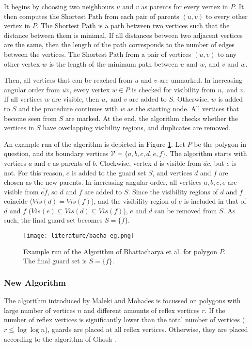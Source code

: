 It begins by choosing two neighbours $u$ and $v$ as parents for every vertex in $P$. It then computes the Shortest Path from each pair of parents $(u, v)$ to every other vertex in $P$. The Shortest Path is a path between two vertices such that the distance between them is minimal. If all distances between two adjacent vertices are the same, then the length of the path corresponds to the number of edges between the vertices. The Shortest Path from a pair of vertices $(u, v)$ to any other vertex $w$ is the length of the minimum path between $u$ and $w$, and $v$ and $w$.

Then, all vertices that can be reached from $u$ and $v$ are unmarked. In increasing angular order from $\overline{uv}$, every vertex $w \in P$ is checked for visibility from $u, \text{ and } v$. If all vertices $w$ are visible, then $u, \text{ and }v$ are added to $S$. Otherwise, $w$ is added to $S$ and the procedure continues with $w$ as the starting node. All vertices that become seen from $S$ are marked. At the end, the algorithm checks whether the vertices in $S$ have overlapping visibility regions, and duplicates are removed.

An example run of the algorithm is depicted in Figure \ref{fig:bhaca}. Let $P$ be the polygon in question, and its boundary vertices $\mathcal V = \{a, b, c, d, e, f\}$. The algorithm starts with vertices $a$ and $c$ as parents of $b$. Clockwise, vertex $d$ is visible from $\overline{ac}$, but $e$ is not. For this reason, $e$ is added to the guard set $S$, and vertices $d$ and $f$ are chosen as the new parents. In increasing angular order, all vertices $a, b, c, e$ are visible from $\overline{ef}$, so $d$ and $f$ are added to $S$. Since the visibility regions of $d$ and $f$ coincide ($\mathit{Vis}(d) = \mathit{Vis}(f)$), and the visibility region of $e$ is included in that of $d$ and $f$ ($\mathit{Vis}(e) \subseteq \mathit{Vis}(d) \subseteq \mathit{Vis}(f)$), $e$ and $d$ can be removed from $S$. As such, the final guard set becomes $S = \{f\}$.

\begin{figure}[h!]
    \centering
    \texttt{[image: literature/bacha-eg.png]}
    \caption{Example run of the Algorithm of Bhattacharya et al. \cite{bhattacharya2016approximability} for polygon $P$. The final guard set is $S = \{f\}$.}
    \label{fig:bhaca}
\end{figure}

\newpage
\subsubsection{New Algorithm}
The algorithm introduced by Maleki and Mohades is focussed on polygons with large number of vertices $n$ and different amounts of reflex vertices $r$. If the number of reflex vertices is significantly lower than the total number of vertices ($r \leq \log \log n$), guards are placed at all reflex vertices. Otherwise, they are placed according to the algorithm of Ghosh \cite{GHOSH2010718}.

